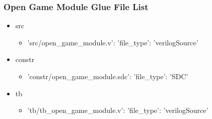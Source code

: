 \subsubsection{Open Game Module Glue File List}
\begin{itemize}
\item src
	\begin{itemize}
	\item {'src/open\_game\_module.v': {'file\_type': 'verilogSource'}}
	\end{itemize}
\item constr
	\begin{itemize}
	\item {'constr/open\_game\_module.sdc': {'file\_type': 'SDC'}}
	\end{itemize}
\item tb
	\begin{itemize}
	\item {'tb/tb\_open\_game\_module.v': {'file\_type': 'verilogSource'}}
	\end{itemize}
\end{itemize}
